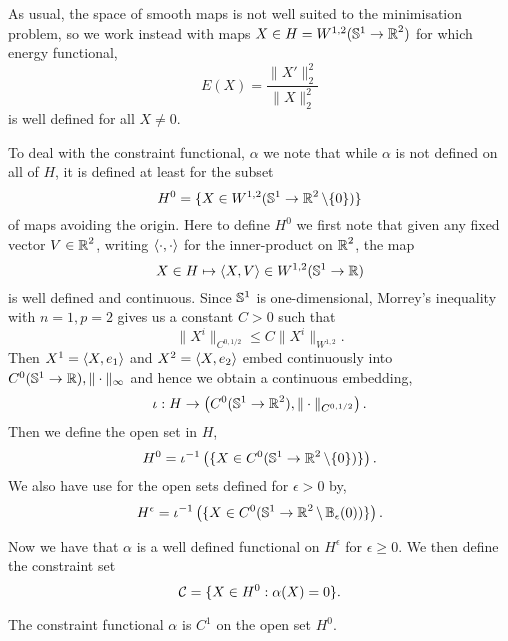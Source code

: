 \documentclass[12pt]{article}
\begin{document}
As usual, the space of smooth maps is not well suited to the minimisation problem, so we work instead with maps \(X \in H = W^{1,2} (\operatorname{\mathbb{S}^1} \to \operatorname{\mathbb{R}}^2)\) for which energy functional,
\[
E(X) = \frac{\|X'\|_2^2}{\|X\|_2^2}
\]
is well defined for all \(X \ne 0\).

To deal with the constraint functional, \(\alpha\) we note that while \(\alpha\) is not defined on all of \(H\), it is defined at least for the subset
\[
H^0 = \{X \in W^{1,2} (\operatorname{\mathbb{S}^1} \to \operatorname{\mathbb{R}}^2 \backslash \{0\})\}
\]
of maps avoiding the origin. Here to define \(H^0\) we first note that given any fixed vector \(V \in \operatorname{\mathbb{R}}^2\), writing \(\left\langle{\cdot},{\cdot}\right\rangle\) for the inner-product on \(\operatorname{\mathbb{R}}^2\), the map
\[
X \in H \mapsto \left\langle{X},{V}\right\rangle \in W^{1,2}(\operatorname{\mathbb{S}^1} \to \operatorname{\mathbb{R}})
\]
is well defined and continuous. Since \(\operatorname{\mathbb{S}^1}\) is one-dimensional, Morrey's inequality with \(n=1,p=2\) gives us a constant \(C > 0\) such that
\[
\|X^i\|_{C^{0,1/2}} \leq C\|X^i\|_{W^{1,2}}.
\]
Then \(X^1 = \left\langle{X},{e_1}\right\rangle\) and \(X^2 = \left\langle{X},{e_2}\right\rangle\) embed continuously into \(C^0(\operatorname{\mathbb{S}^1} \to \operatorname{\mathbb{R}}), \|\cdot\|_{\infty}\) and hence we obtain a continuous embedding,
\[
\iota : H \to \left(C^0(\operatorname{\mathbb{S}^1} \to \operatorname{\mathbb{R}}^2), \|\cdot\|_{C^{0,1/2}}\right).
\]
Then we define the open set in \(H\),
\begin{equation}
\label{eq:H0}
H^0 = \iota^{-1}\left(\{X \in C^0(\operatorname{\mathbb{S}^1} \to \operatorname{\mathbb{R}}^2\backslash \{0\})\}\right).
\end{equation}
We also have use for the open sets defined for \(\epsilon > 0\) by,
\begin{equation}
\label{eq:Hepsilon}
H^{\epsilon} = \iota^{-1}\left(\{X \in C^0(\operatorname{\mathbb{S}^1} \to \operatorname{\mathbb{R}}^2\backslash \operatorname{\mathbb{B}}_{\epsilon}(0))\}\right).
\end{equation}

Now we have that \(\alpha\) is a well defined functional on \(H^{\epsilon}\) for \(\epsilon \geq 0\). We then define the constraint set
\begin{equation}
\label{eq:constraintsets}
\operatorname{\mathcal{C}} = \{X \in H^0 : \alpha(X) = 0\}.
\end{equation}

\begin{lem}
\label{lem:Csubmanifold}
The constraint functional \(\alpha\) is \(C^1\) on the open set \(H^0\).
\end{lem}
\end{document}
